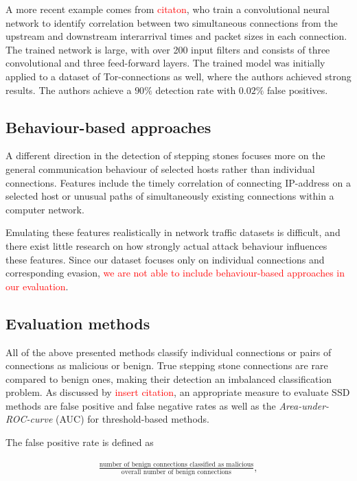 \documentclass[conference]{IEEEtran}\usepackage[]{graphicx}\usepackage[]{color}
\begin{document}
A more recent example comes from \textcolor{red}{citaton}, who train a convolutional neural network to identify correlation between two simultaneous connections from the upstream and downstream interarrival times and packet sizes in each connection. The trained network is large, with over 200 input filters and consists of three convolutional and three feed-forward layers. The trained model was initially applied to a dataset of Tor-connections as well, where the authors achieved strong results. 
The authors achieve a $90\%$ detection rate with $0.02 \%$ false positives. 

\subsection{Behaviour-based approaches}

A different direction in the detection of stepping stones focuses more on the general communication behaviour of selected hosts rather than individual connections. Features include the timely correlation of connecting IP-address on a selected host or unusual paths of simultaneously existing connections within a computer network.

Emulating these features realistically in network traffic datasets is difficult, and there exist little research on how strongly actual attack behaviour influences these features. Since our dataset focuses only on individual connections and corresponding evasion, \textcolor{red}{we are not able to include behaviour-based approaches in our evaluation}.




\subsection{Evaluation methods}
All of the above presented methods classify individual connections or pairs of connections as malicious or benign. True stepping stone connections are rare compared to benign ones, making their detection an imbalanced classification problem. As discussed by \textcolor{red}{insert citation}, an appropriate measure to evaluate SSD methods are false positive and false negative rates as well as the \textit{Area-under-ROC-curve} (AUC) for threshold-based methods.

The false positive rate is defined as

\begin{align*}
\frac{\text{number of benign connections classified as malicious}}{\text{overall number of benign connections}},
\end{align*}
\end{document}
